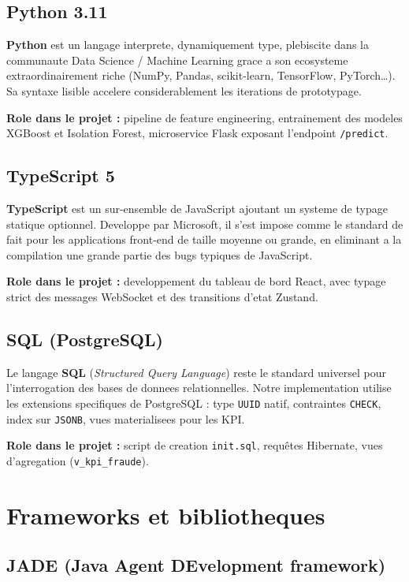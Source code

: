 \documentclass[12pt,a4paper,oneside]{report}
\begin{document}
\subsection{Python 3.11}

\textbf{Python} est un langage interprete, dynamiquement type, plebiscite
dans la communaute Data Science / Machine Learning grace a son ecosysteme
extraordinairement riche (NumPy, Pandas, scikit-learn, TensorFlow,
PyTorch\dots). Sa syntaxe lisible accelere considerablement les iterations
de prototypage.

\textbf{Role dans le projet :} pipeline de feature engineering, entrainement
des modeles XGBoost et Isolation Forest, microservice Flask exposant
l'endpoint \texttt{/predict}.

\subsection{TypeScript 5}

\textbf{TypeScript} est un sur-ensemble de JavaScript ajoutant un systeme de
typage statique optionnel. Developpe par Microsoft, il s'est impose comme le
standard de fait pour les applications front-end de taille moyenne ou
grande, en eliminant a la compilation une grande partie des bugs typiques de
JavaScript.

\textbf{Role dans le projet :} developpement du tableau de bord React, avec
typage strict des messages WebSocket et des transitions d'etat Zustand.

\subsection{SQL (PostgreSQL)}

Le langage \textbf{SQL} (\emph{Structured Query Language}) reste le standard
universel pour l'interrogation des bases de donnees relationnelles. Notre
implementation utilise les extensions specifiques de PostgreSQL : type
\texttt{UUID} natif, contraintes \texttt{CHECK}, index sur \texttt{JSONB},
vues materialisees pour les KPI.

\textbf{Role dans le projet :} script de creation \texttt{init.sql},
requ\^etes Hibernate, vues d'agregation (\texttt{v\_kpi\_fraude}).

\section{Frameworks et bibliotheques}

\subsection{JADE (Java Agent DEvelopment framework)}
\end{document}
